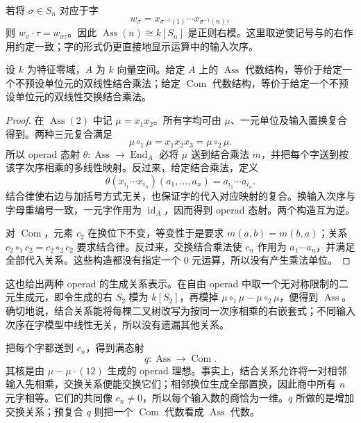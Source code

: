 \ProseParagraphBreak
若将 \(\sigma\in S_n\) 对应于字
\[
	w_\sigma=x_{\sigma^{-1}(1)}\cdots x_{\sigma^{-1}(n)},
\]
则 \(w_\sigma\cdot\tau=w_{\sigma\tau}\)。因此 \(\operatorname{Ass}(n)\cong k[S_n]\) 是正则右模。这里取逆使记号与的右作用约定一致；字的形式仍更直接地显示运算中的输入次序。

\begin{proposition}\label{b4:prop:ass-com-algebras}
	设 \(k\) 为特征零域，\(A\) 为 \(k\) 向量空间。给定 \(A\) 上的 \(\operatorname{Ass}\) 代数结构，等价于给定一个不预设单位元的双线性结合乘法；给定 \(\operatorname{Com}\) 代数结构，等价于给定一个不预设单位元的双线性交换结合乘法。
\end{proposition}
\begin{proof}
	在 \(\operatorname{Ass}(2)\) 中记 \(\mu=x_1x_2\)。所有字均可由 \(\mu\)、一元单位及输入置换复合得到。两种三元复合满足
	\[
		\mu\circ_1\mu=x_1x_2x_3=\mu\circ_2\mu.
	\]
	所以 operad 态射 \(\theta:\operatorname{Ass}\to\operatorname{End}_A\) 必将 \(\mu\) 送到结合乘法 \(m\)，并把每个字送到按该字次序相乘的多线性映射。反过来，给定结合乘法，定义
	\[
		\theta(x_{i_1}\cdots x_{i_n})(a_1,\ldots,a_n)
		=a_{i_1}\cdots a_{i_n}.
	\]
	结合律使右边与加括号方式无关，也保证字的代入对应映射的复合。换输入次序与字母重编号一致，一元字作用为 \(\operatorname{id}_A\)，因而得到 operad 态射。两个构造互为逆。

	对 \(\operatorname{Com}\)，元素 \(c_2\) 在换位下不变，等变性于是要求 \(m(a,b)=m(b,a)\)；关系 \(c_2\circ_1c_2=c_2\circ_2c_2\) 要求结合律。反过来，交换结合乘法使 \(c_n\) 作用为 \(a_1\cdots a_n\)，并满足全部代入关系。这些构造都没有指定一个 \(0\) 元运算，所以没有产生乘法单位。
\end{proof}

这也给出两种 operad 的生成关系表示。在自由 operad 中取一个无对称限制的二元生成元，即令生成的右 \(S_2\) 模为 \(k[S_2]\)，再模掉 \(\mu\circ_1\mu-\mu\circ_2\mu\)，便得到 \(\operatorname{Ass}\)。确切地说，结合关系能将每棵二叉树改写为按同一次序相乘的右嵌套式；不同输入次序在字模型中线性无关，所以没有遗漏其他关系。

\ProseParagraphBreak
把每个字都送到 \(c_n\)，得到满态射
\[
	q:\operatorname{Ass}\longrightarrow\operatorname{Com}.
\]
其核是由 \(\mu-\mu\cdot(12)\) 生成的 operad 理想。事实上，结合关系允许将一对相邻输入先相乘，交换关系便能交换它们；相邻换位生成全部置换，因此商中所有 \(n\) 元字相等。它们的共同像 \(c_n\ne0\)，所以每个输入数的商恰为一维。\(q\) 所做的是增加交换关系；预复合 \(q\) 则把一个 \(\operatorname{Com}\) 代数看成 \(\operatorname{Ass}\) 代数。

